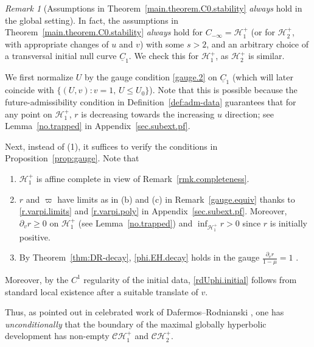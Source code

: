 \documentclass[10pt, reqno]{amsart}
\theoremstyle{definition}
\theoremstyle{remark}
\newtheorem{remark}[theorem]{Remark}
\numberwithin{equation}{section}
\newcommand{\set}[1]{\{#1\}}
\newcommand{\rd}{\partial}
\newcommand{\0}{\emptyset}
\newcommand{\calC}{\mathcal C}
\newcommand{\calH}{\mathcal H}
\newcommand{\f}{\frac}
\newcommand{\CH}{\calC \calH^{+}}		%
\newcommand{\EH}{\calH^{+}}
\begin{document}
\begin{remark}[Assumptions in Theorem~\ref{main.theorem.C0.stability} \emph{always} hold in the global setting]\label{C0.stab.assumptions}
In fact, the assumptions in Theorem~\ref{main.theorem.C0.stability} \emph{always} hold for $C_{-\infty}=\EH_1$ (or for $\EH_2$, with appropriate changes of $u$ and $v$) with some $s>2$, and an arbitrary choice of a transversal initial null curve $\underline{C}_{1}$. We check this for $\EH_1$, as $\EH_2$ is similar. 

We first normalize $U$ by the gauge condition \eqref{gauge.2} on $\underline{C}_{1}$ (which will later coincide with $\set{(U, v): v=1, \, U \leq U_{0}}$). Note that this is possible because the future-admissibility condition in Definition~\ref{def:adm-data} guarantees that for any point on $\EH_1$, $r$ is decreasing towards the increasing $u$ direction; see Lemma~\ref{no.trapped} in Appendix~\ref{sec.subext.pf}.

Next, instead of (1), it suffices to verify the conditions in Proposition~\ref{prop:gauge}. Note that
\begin{enumerate}
\item $\EH_1$ is affine complete in view of Remark~\ref{rmk.completeness}.
\item $r$ and $\varpi$ have limits as in (b) and (c) in Remark~\ref{gauge.equiv} thanks to \eqref{r.varpi.limits} and \eqref{r.varpi.poly} in Appendix~\ref{sec.subext.pf}. Moreover, $\rd_{v} r \geq 0$ on $\EH_{1}$ (see Lemma~\ref{no.trapped}) and $\inf_{\EH_{1}} r > 0$ since $r$ is initially positive.
\item By Theorem~\ref{thm:DR-decay}, \eqref{phi.EH.decay} holds in the gauge $\f{\rd_v r}{1-\mu}=1$ .
\end{enumerate}
Moreover, by the $C^{1}$ regularity of the initial data, \eqref{rdUphi.initial} follows from standard local existence after a suitable translate of $v$.

Thus, as pointed out in celebrated work of Dafermos--Rodnianski \cite{DRPL}, one has \emph{unconditionally}  that the boundary of the maximal globally hyperbolic development has non-empty $\CH_1$ and $\CH_2$.

\end{remark}
\end{document}
